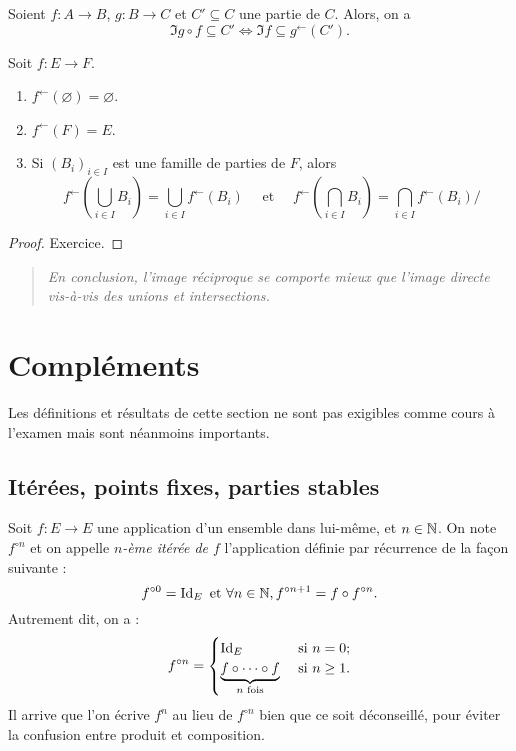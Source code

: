 \begin{exemple}
Soient $f : A\to B$,  $g : B\to C$ et $C'\subseteq C$ une partie de $C$. Alors, on a 
\[\Im g\circ f \subseteq C' \iff \Im f \subseteq g^\leftarrow(C').\]
\end{exemple}

\begin{proposition}
Soit $f : E\to F$.
\begin{enumerate}
\item $f^\leftarrow(\varnothing)=\varnothing$.
\item $f^\leftarrow(F)=E$.
\item Si $(B_i)_{i\in I}$ est une famille de parties de $F$, alors 
\[
f^\leftarrow\left(\bigcup_{i\in I}B_i\right) 
= \bigcup_{i\in I} f^\leftarrow(B_i)
\quad \text{ et } \quad 
f^\leftarrow\left(\bigcap_{i\in I}B_i\right) 
= \bigcap_{i\in I} f^\leftarrow(B_i)/
\]
\end{enumerate}
\end{proposition}
\begin{proof} Exercice.
\end{proof}

\begin{quote}
\emph{En conclusion, l'image réciproque se comporte mieux que l'image directe vis-à-vis des unions et intersections.}
\end{quote}


\section{Compléments}

Les définitions et résultats de cette section ne sont pas exigibles comme cours à l'examen mais sont néanmoins importants.

\subsection{Itérées, points fixes, parties stables}

\begin{definition}
Soit $f : E\to E$ une application d'un ensemble dans lui-même, et $n\in \mathbb{N}$. On  note $f^{\circ n}$ et on appelle \emph{$n$-ème itérée de $f$}  l'application définie par récurrence de la façon suivante :
\[ f^{\circ 0} = \operatorname{Id}_E \text{ et } \forall n\in \mathbb{N}, f^{\circ n+1} = f\circ f^{\circ n}.\]
Autrement dit, on a :
\[ 
f^{\circ n} = \begin{cases}
\operatorname{Id}_E & \text{ si } n=0;\\
\underbrace{f\circ \dots \circ f}_{n \text{ fois}} & \text{ si } n\geq 1.
\end{cases}
\]
Il arrive que l'on écrive $f^n$ au lieu de $f^{\circ n}$ bien que ce soit déconseillé, pour éviter la confusion entre produit et composition.
\end{definition}

